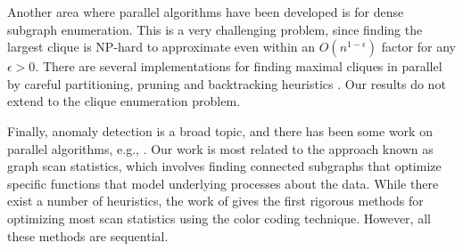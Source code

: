 Another area where parallel algorithms have been developed is for dense subgraph enumeration.
This is a very challenging problem, since finding the largest clique is NP-hard to
approximate even within an $O(n^{1-\epsilon})$ factor for any $\epsilon>0$.
There are several implementations for finding maximal cliques in parallel by
careful partitioning, pruning and backtracking heuristics
\cite{schmidt2009scalable, zhao2016parallel, aparicio:ispa14, cheng:kdd12, du:mcd09}.
Our results do not extend to the clique enumeration problem.

Finally, anomaly detection is a broad topic, and there has been some work
on parallel algorithms, e.g., \cite{shanbhag:icccn08}. Our work is most related to
the approach known as graph scan statistics, which involves finding connected subgraphs
that optimize specific functions that model underlying processes about the data.
While there exist a number of heuristics, the work of \cite{cadena:sdm17} gives the
first rigorous methods for optimizing most scan statistics using the color coding technique.
However, all these methods are sequential.
